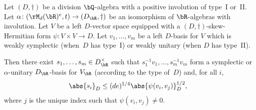 \begin{lemma} \label{semi-orthogonal-normalise}
Let $(D,\dag)$ be a division $\bQ$-algebra with a positive involution of type~I or~II.
Let $\alpha \colon (\rM_d(\bR)^e,t) \to (D_\bR,\dag)$ be an isomorphism of $\bR$-algebras with involution.
Let $V$ be a left $D$-vector space equipped with a $(D,\dag)$-skew-Hermitian form \hbox{$\psi \colon V \times V \to D$}.
Let $v_1, \dotsc, v_m$ be a left $D$-basis for $V$ which is weakly symplectic (when~$D$ has type~I) or weakly unitary (when $D$ has type~II).

Then there exist $s_1, \dotsc, s_m \in D_\bR^\times$
such that $s_1^{-1} v_1, \dotsc, s_m^{-1} v_m$ form a symplectic or $\alpha$-unitary $D_\bR$-basis for $V_\bR$ (according to the type of~$D$) and, for all $i$,
\[
\abs{s_i}_D \leq (de)^{1/4} \abs{\psi(v_i, v_j)}_D^{1/2},
\]
where $j$ is the unique index such that $\psi(v_i, v_j) \neq 0$.
\end{lemma}

